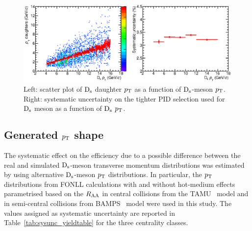 \begin{figure}[!h]
 \centering
 \includegraphics[angle=0, width=13cm]{./FigCap5/PIDsystDs_MCall.eps}
 \caption{Left: scatter plot of ${\rm D_s}$ daughter $p_{\rm T}$ as a function of ${\rm D_s}$-meson $p_{\rm T}$. Right: systematic uncertainty on the tighter PID selection used for ${\rm D_s}$ meson as a function of ${\rm D_s}$ $p_{\rm T}$.}
 \label{fig:DsPIDsys} 
\end{figure}

\subsection{Generated $p_{\rm T}$ shape}
The systematic effect on the efficiency due to a possible difference between 
the real and simulated ${\rm D_s}$-meson transverse momentum distributions
was estimated by using alternative ${\rm D_s}$-meson $p_{\rm T}$ distributions.
In particular, the $p_{\rm T}$ distributions from FONLL calculations with
and without hot-medium effects parametrised based on the $R_{\rm AA}$ in central collisions from the 
TAMU~\cite{He:2014cla} model and in semi-central collisions from 
BAMPS~\cite{Uphoff:2014hza} model were used in this study.
The values assigned as systematic uncertainty are reported in 
Table~\ref{tab:sysunc_yieldtable} for the three centrality classes.


